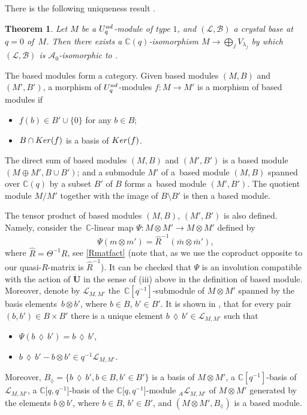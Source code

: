 \documentclass[11pt]{article}
\numberwithin{equation}{section}
\numberwithin{equation}{section}
\newtheorem{teo}{Theorem}[section]
\theoremstyle{definition}
\newcommand{\mc}{\mathbb{C}}
\newcommand{\Ll}{{\mathcal L}}
\newcommand{\ra}{\rightarrow}
\begin{document}
There is the following uniqueness result \cite[Theorem 3]{Kashiwara1}.

\begin{teo}\label{Kashiuniqueteo} Let $M$ be a $U_q^{\rm ad}$-module of type $1$, and $(\Ll, \mathcal{B})$ a crystal base at $q=0$ of~$M$. Then there exists a $\mc(q)$-isomorphism $M\ra \bigoplus_j V_{\lambda_j}$ by which $(\Ll, \mathcal{B})$ is $\mathcal{A}_0$-isomorphic to \smash{$ \bigoplus_j \big(\Ll_{\lambda_j}^{\rm low}, \mathcal{B}_{\lambda_j}^{\rm low}\big)$}.
\end{teo}

The based modules form a category. Given based modules $(M,B)$ and $(M',B')$, a morphism of $U_q^{\rm ad}$-modules $f\colon M\ra M'$ is a morphism of based modules if{\samepage
\begin{itemize}\itemsep=0pt
\item[(a)] $f(b)\in B'\cup\{0\}$ for any $b\in B$;
\item[(b)] $B\cap {\rm Ker}(f)$ is a basis of ${\rm Ker}(f)$.
\end{itemize}}%

\pagebreak

\noindent
The direct sum of based modules $(M,B)$ and $(M',B')$ is a based module $(M \oplus M',B\cup B')$; and a submodule $M'$ of a~based module $(M,B)$ spanned over $\mc(q)$ by a subset $B'$ of $B$ forms a~based module $(M',B')$. The quotient module $M/M'$ together with the image of $B\setminus B'$ is then a based module.

The tensor product of based modules $(M,B)$, $(M',B')$ is also defined. Namely, consider the~$\mc$-linear map $\Psi\colon M\otimes M' \ra M\otimes M'$ defined by
\[
\Psi(m\otimes m') = \hat{R}^{-1}(\bar{m}\otimes \bar{m}'),
\] where $\hat{R} = \Theta^{-1}R$, see \eqref{Rmatfact} (note that, as we use the coproduct opposite to \cite{Lusztig} our quasi-$R$-matrix is $\hat{R}^{-1}$). It can be checked that $\Psi$ is an involution compatible with the action of $\dot{\mathbf{U}}$ in the sense of (iii) above in the definition of based module. Moreover, denote by $\Ll_{M,M'}$ the~$\mc[q^{-1}]$-submodule of $M\otimes M'$ spanned by the basis elements~$b\otimes b'$, where $b\in B$, $b'\in B'$. It is shown in \cite[Section~27.3]{Lusztig}, that for every pair $(b,b')\in B\times B'$ there is a unique element $b\,\lozenge\, b'\in \Ll_{M,M'}$ such that
\begin{itemize}\itemsep=0pt
\item[(a)] $\Psi(b\,\lozenge\, b')=b\,\lozenge\, b'$,
\item[(b)] $b\,\lozenge\, b' - b\otimes b'\in q^{-1} \mathcal{\Ll}_{M,M'}$.
\end{itemize}
Moreover, $B_{\lozenge} = \{b\,\lozenge\, b', b\in B, b'\in B'\}$ is a basis of $M\otimes M'$, a $\mc[q^{-1}]$-basis of $\Ll_{M,M'}$, a $\mc\big[q,q^{-1}\big]$-basis of the $\mc\big[q,q^{-1}\big]$-module ${}_A\Ll_{M,M'}$ of $M\otimes M'$ generated by the elements $b\otimes b'$, where $b\in B$, $b'\in B'$, and $(M\otimes M',B_{\lozenge})$ is a based module.
\end{document}
